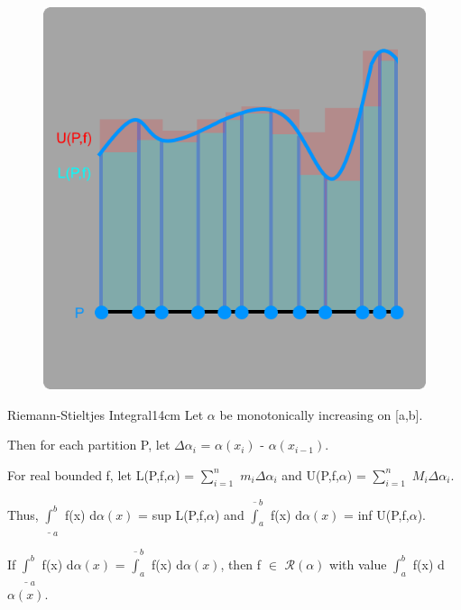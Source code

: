     \begin{figure}[h]
        \centering
        \includegraphics[scale=0.35]{Images/13.1.1.png}
    \end{figure}



    \begin{definition}{Riemann-Stieltjes Integral}{14cm}
        Let $\alpha$ be monotonically increasing on [a,b].
        
        Then for each partition P, let
        $\Delta \alpha_i$ = $\alpha(x_i)$ - $\alpha(x_{i-1})$.

        For real bounded f, let
        L(P,f,$\alpha$) = $\sum_{i=1}^n$ $m_i \Delta \alpha_i$
        and U(P,f,$\alpha$) = $\sum_{i=1}^n$ $M_i \Delta \alpha_i$.

        Thus, $\underline{\int}_a^b$ f(x) d$\alpha(x)$ = sup L(P,f,$\alpha$)
        and $\overline{\int}_a^b$ f(x) d$\alpha(x)$ = inf U(P,f,$\alpha$).

        \vspace{0.2cm}

        If $\underline{\int}_a^b$ f(x) d$\alpha(x)$
        = $\overline{\int}_a^b$ f(x) d$\alpha(x)$, then
        f $\in$ $\mathscr{R}(\alpha)$ with value $\int_a^b$ f(x) d$\alpha(x)$.        
    \end{definition}


